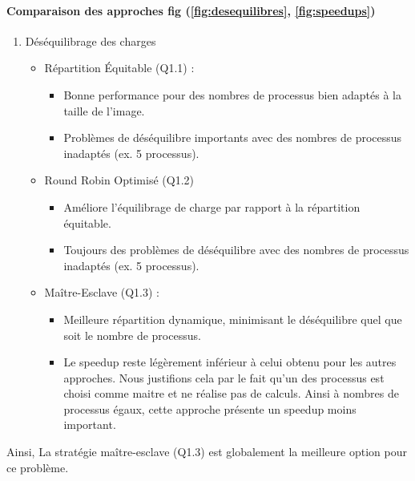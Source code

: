 \documentclass[a4paper,13pt]{book}
\begin{document}
  \paragraph{Comparaison des approches fig (\ref{fig:desequilibres}, \ref{fig:speedups})}
  \begin{enumerate}
    \item Déséquilibrage des charges 
    \begin{itemize}
      \item Répartition Équitable (Q1.1) :
      \begin{itemize}
        \item Bonne performance pour des nombres de processus bien adaptés à la taille de l'image.
        \item Problèmes de déséquilibre importants avec des nombres de processus inadaptés (ex. 5 processus).  
      \end{itemize}
      \item Round Robin Optimisé (Q1.2) 
      \begin{itemize}
        \item Améliore l'équilibrage de charge par rapport à la répartition équitable.
        \item Toujours des problèmes de déséquilibre avec des nombres de processus inadaptés (ex. 5 processus).
      \end{itemize}
      \item Maître-Esclave (Q1.3) :
      \begin{itemize}
        \item Meilleure répartition dynamique, minimisant le déséquilibre quel que soit le nombre de processus.
        \item Le speedup reste légèrement inférieur à celui obtenu pour les autres approches. Nous justifions cela par le fait qu'un des processus est choisi comme maitre et ne réalise pas de calculs. Ainsi à nombres de processus égaux, cette approche présente un speedup moins important.
      \end{itemize} 
    \end{itemize}
  \end{enumerate}
Ainsi, La stratégie maître-esclave (Q1.3) est globalement la meilleure option pour ce problème.
\end{document}
